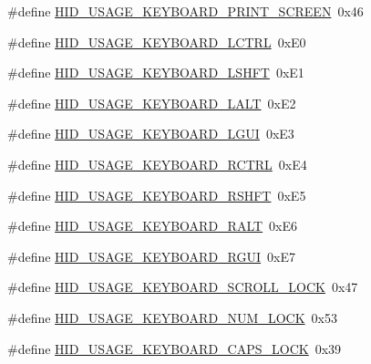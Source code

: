 \begin{DoxyCompactItemize}
\item 
\#define \hyperlink{group__USBD__HID_gad4754982a8d78739f7439a29ca8a8241}{H\-I\-D\-\_\-\-U\-S\-A\-G\-E\-\_\-\-K\-E\-Y\-B\-O\-A\-R\-D\-\_\-\-P\-R\-I\-N\-T\-\_\-\-S\-C\-R\-E\-E\-N}~0x46
\item 
\#define \hyperlink{group__USBD__HID_gae3b79c5b31060eabe7779b54cb164f6d}{H\-I\-D\-\_\-\-U\-S\-A\-G\-E\-\_\-\-K\-E\-Y\-B\-O\-A\-R\-D\-\_\-\-L\-C\-T\-R\-L}~0x\-E0
\item 
\#define \hyperlink{group__USBD__HID_ga294341928862609e496b3092d56141f4}{H\-I\-D\-\_\-\-U\-S\-A\-G\-E\-\_\-\-K\-E\-Y\-B\-O\-A\-R\-D\-\_\-\-L\-S\-H\-F\-T}~0x\-E1
\item 
\#define \hyperlink{group__USBD__HID_ga828bbc2e17dd2f1d57dbc35763af7e58}{H\-I\-D\-\_\-\-U\-S\-A\-G\-E\-\_\-\-K\-E\-Y\-B\-O\-A\-R\-D\-\_\-\-L\-A\-L\-T}~0x\-E2
\item 
\#define \hyperlink{group__USBD__HID_ga45a8236a486055442173a043f1e78b0e}{H\-I\-D\-\_\-\-U\-S\-A\-G\-E\-\_\-\-K\-E\-Y\-B\-O\-A\-R\-D\-\_\-\-L\-G\-U\-I}~0x\-E3
\item 
\#define \hyperlink{group__USBD__HID_gab288a000028dab0d7a6683d9d0e66991}{H\-I\-D\-\_\-\-U\-S\-A\-G\-E\-\_\-\-K\-E\-Y\-B\-O\-A\-R\-D\-\_\-\-R\-C\-T\-R\-L}~0x\-E4
\item 
\#define \hyperlink{group__USBD__HID_ga16c1d891765fa8aeede0394ca98fb87d}{H\-I\-D\-\_\-\-U\-S\-A\-G\-E\-\_\-\-K\-E\-Y\-B\-O\-A\-R\-D\-\_\-\-R\-S\-H\-F\-T}~0x\-E5
\item 
\#define \hyperlink{group__USBD__HID_gaf43e59f05daae6f0dcbc849464e2789c}{H\-I\-D\-\_\-\-U\-S\-A\-G\-E\-\_\-\-K\-E\-Y\-B\-O\-A\-R\-D\-\_\-\-R\-A\-L\-T}~0x\-E6
\item 
\#define \hyperlink{group__USBD__HID_ga556095c359b0a078bc0aa99cd78ab227}{H\-I\-D\-\_\-\-U\-S\-A\-G\-E\-\_\-\-K\-E\-Y\-B\-O\-A\-R\-D\-\_\-\-R\-G\-U\-I}~0x\-E7
\item 
\#define \hyperlink{group__USBD__HID_ga08cb9b6d6951f1d62d09cad92225beb6}{H\-I\-D\-\_\-\-U\-S\-A\-G\-E\-\_\-\-K\-E\-Y\-B\-O\-A\-R\-D\-\_\-\-S\-C\-R\-O\-L\-L\-\_\-\-L\-O\-C\-K}~0x47
\item 
\#define \hyperlink{group__USBD__HID_ga3e2e485b200dc9ce936ded0d045ff4b7}{H\-I\-D\-\_\-\-U\-S\-A\-G\-E\-\_\-\-K\-E\-Y\-B\-O\-A\-R\-D\-\_\-\-N\-U\-M\-\_\-\-L\-O\-C\-K}~0x53
\item 
\#define \hyperlink{group__USBD__HID_gaa75d2912123a694a9e0de0761a7d631b}{H\-I\-D\-\_\-\-U\-S\-A\-G\-E\-\_\-\-K\-E\-Y\-B\-O\-A\-R\-D\-\_\-\-C\-A\-P\-S\-\_\-\-L\-O\-C\-K}~0x39
\end{DoxyCompactItemize}
